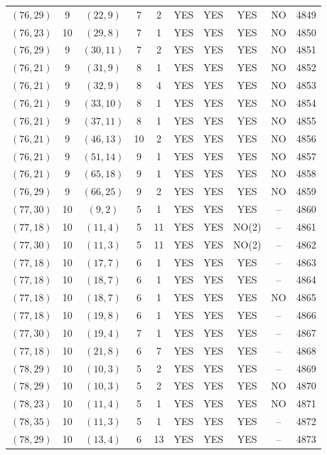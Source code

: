 \begin{longtable}{|c|c|c|c|c|c|c|c|c|c|}
$(76, 29)$ & 9 & $(22, 9)$ & 7 & 2 & YES & YES & YES & NO & 4849\\
$(76, 23)$ & 10 & $(29, 8)$ & 7 & 1 & YES & YES & YES & NO & 4850\\
$(76, 29)$ & 9 & $(30, 11)$ & 7 & 2 & YES & YES & YES & NO & 4851\\
$(76, 21)$ & 9 & $(31, 9)$ & 8 & 1 & YES & YES & YES & NO & 4852\\
$(76, 21)$ & 9 & $(32, 9)$ & 8 & 4 & YES & YES & YES & NO & 4853\\
$(76, 21)$ & 9 & $(33, 10)$ & 8 & 1 & YES & YES & YES & NO & 4854\\
$(76, 21)$ & 9 & $(37, 11)$ & 8 & 1 & YES & YES & YES & NO & 4855\\
$(76, 21)$ & 9 & $(46, 13)$ & 10 & 2 & YES & YES & YES & NO & 4856\\
$(76, 21)$ & 9 & $(51, 14)$ & 9 & 1 & YES & YES & YES & NO & 4857\\
$(76, 21)$ & 9 & $(65, 18)$ & 9 & 1 & YES & YES & YES & NO & 4858\\
$(76, 29)$ & 9 & $(66, 25)$ & 9 & 2 & YES & YES & YES & NO & 4859\\
$(77, 30)$ & 10 & $(9, 2)$ & 5 & 1 & YES & YES & YES & -- & 4860\\
$(77, 18)$ & 10 & $(11, 4)$ & 5 & 11 & YES & YES & NO(2) & -- & 4861\\
$(77, 30)$ & 10 & $(11, 3)$ & 5 & 11 & YES & YES & NO(2) & -- & 4862\\
$(77, 18)$ & 10 & $(17, 7)$ & 6 & 1 & YES & YES & YES & -- & 4863\\
$(77, 18)$ & 10 & $(18, 7)$ & 6 & 1 & YES & YES & YES & -- & 4864\\
$(77, 18)$ & 10 & $(18, 7)$ & 6 & 1 & YES & YES & YES & NO & 4865\\
$(77, 18)$ & 10 & $(19, 8)$ & 6 & 1 & YES & YES & YES & -- & 4866\\
$(77, 30)$ & 10 & $(19, 4)$ & 7 & 1 & YES & YES & YES & -- & 4867\\
$(77, 18)$ & 10 & $(21, 8)$ & 6 & 7 & YES & YES & YES & -- & 4868\\
$(78, 29)$ & 10 & $(10, 3)$ & 5 & 2 & YES & YES & YES & -- & 4869\\
$(78, 29)$ & 10 & $(10, 3)$ & 5 & 2 & YES & YES & YES & NO & 4870\\
$(78, 23)$ & 10 & $(11, 4)$ & 5 & 1 & YES & YES & YES & NO & 4871\\
$(78, 35)$ & 10 & $(11, 3)$ & 5 & 1 & YES & YES & YES & -- & 4872\\
$(78, 29)$ & 10 & $(13, 4)$ & 6 & 13 & YES & YES & YES & -- & 4873\\

\end{longtable}
